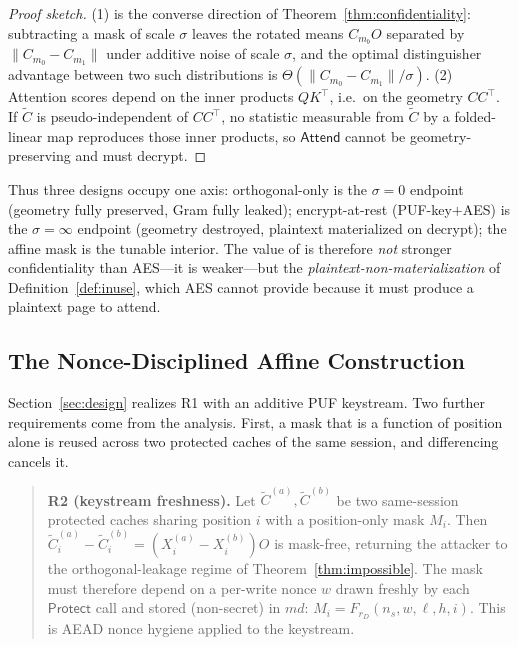 \begin{proof}[Proof sketch]
(1) is the converse direction of Theorem~\ref{thm:confidentiality}: subtracting a
mask of scale $\sigma$ leaves the rotated means $C_{m_b}O$ separated by
$\lVert C_{m_0}-C_{m_1}\rVert$ under additive noise of scale $\sigma$, and the
optimal distinguisher advantage between two such distributions is
$\Theta(\lVert C_{m_0}-C_{m_1}\rVert/\sigma)$. (2) Attention scores depend on the
inner products $QK^\top$, i.e.\ on the geometry $CC^\top$. If $\tilde C$ is
pseudo-independent of $CC^\top$, no statistic measurable from $\tilde C$ by a
folded-linear map reproduces those inner products, so $\mathsf{Attend}$ cannot be
geometry-preserving and must decrypt.
\end{proof}

Thus three designs occupy one axis: orthogonal-only is the $\sigma=0$ endpoint
(geometry fully preserved, Gram fully leaked); encrypt-at-rest (PUF-key$+$AES) is
the $\sigma=\infty$ endpoint (geometry destroyed, plaintext materialized on
decrypt); the affine mask is the tunable interior. The value of \sys{} is therefore
\emph{not} stronger confidentiality than AES---it is weaker---but the
\emph{plaintext-non-materialization} of Definition~\ref{def:inuse}, which AES cannot
provide because it must produce a plaintext page to attend.

\subsection{The Nonce-Disciplined Affine Construction}
\label{sec:theory-construction}

Section~\ref{sec:design} realizes R1 with an additive PUF keystream. Two further
requirements come from the analysis. First, a mask that is a function of position
alone is reused across two protected caches of the same session, and differencing
cancels it.

\begin{quote}
\textbf{R2 (keystream freshness).} Let $\tilde C^{(a)},\tilde C^{(b)}$ be two
same-session protected caches sharing position $i$ with a position-only mask
$M_i$. Then $\tilde C^{(a)}_i-\tilde C^{(b)}_i=(X^{(a)}_i-X^{(b)}_i)O$ is
mask-free, returning the attacker to the orthogonal-leakage regime of
Theorem~\ref{thm:impossible}. The mask must therefore depend on a per-write nonce
$w$ drawn freshly by each $\mathsf{Protect}$ call and stored (non-secret) in
$\mathit{md}$: $M_i=F_{r_D}(n_s,w,\ell,h,i)$. This is AEAD nonce hygiene applied to
the keystream.
\end{quote}

